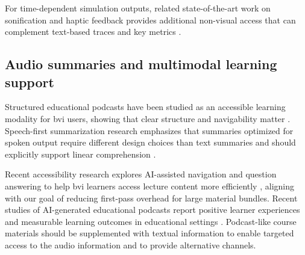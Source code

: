 For time-dependent simulation outputs, related state-of-the-art work on sonification and haptic feedback provides additional non-visual access that can complement text-based traces and key metrics \cite{Spagnuolo2025Sonification}.

\subsection{Audio summaries and multimodal learning support}

Structured educational podcasts have been studied as an accessible learning modality for \ac{bvi} users, showing that clear structure and navigability matter \cite{Buzzi2011StructuredPodcasts}. Speech-first summarization research emphasizes that summaries optimized for spoken output require different design choices than text summaries and should explicitly support linear comprehension \cite{McKeown2005TextToSpeech}.

Recent accessibility research explores AI-assisted navigation and question answering to help \ac{bvi} learners access lecture content more efficiently \cite{Anderer2025LectureVideos}, aligning with our goal of reducing first-pass overhead for large material bundles. Recent studies of AI-generated educational podcasts report positive learner experiences and measurable learning outcomes in educational settings \cite{Do2024PAIGE}. Podcast-like course materials should be supplemented with textual information to enable targeted access to the audio information and to provide alternative channels.
